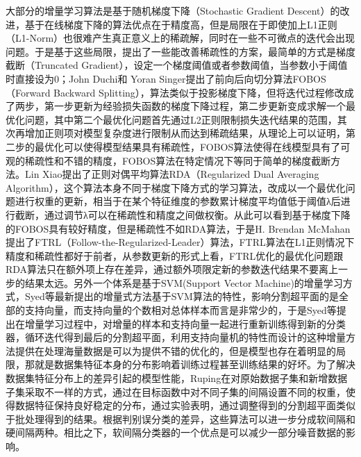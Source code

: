 大部分的增量学习算法是基于随机梯度下降（Stochastic Gradient Descent）的改进\cite{hazan2007logarithmic}，基于在线梯度下降的算法优点在于精度高，但是局限在于即使加上L1正则（L1-Norm）也很难产生真正意义上的稀疏解，同时在一些不可微点的迭代会出现问题。于是基于这些局限，提出了一些能改善稀疏性的方案，最简单的方式是梯度截断（Truncated Gradient）\cite{langford2009sparse}，设定一个梯度阈值或者参数阈值，当参数小于阈值时直接设为0；John Duchi和 Yoran Singer\cite{duchi2009efficient}提出了前向后向切分算法FOBOS（Forward Backward Splitting），算法类似于投影梯度下降，但将迭代过程修改成了两步，第一步更新为经验损失函数的梯度下降过程，第二步更新变成求解一个最优化问题，其中第二个最优化问题首先通过L2正则限制损失迭代结果的范围，其次再增加正则项对模型复杂度进行限制从而达到稀疏结果，从理论上可以证明，第二步的最优化可以使得模型结果具有稀疏性，FOBOS算法使得在线模型具有了可观的稀疏性和不错的精度，FOBOS算法在特定情况下等同于简单的梯度截断方法。Lin Xiao\cite{xiao2010dual}提出了正则对偶平均算法RDA（Regularized Dual Averaging Algorithm），这个算法本身不同于梯度下降方式的学习算法，改成以一个最优化问题进行权重的更新，相当于在某个特征维度的参数累计梯度平均值低于阈值λ后进行截断，通过调节λ可以在稀疏性和精度之间做权衡。从此可以看到基于梯度下降的FOBOS具有较好精度，但是稀疏性不如RDA算法，于是H. Brendan McMahan提出了FTRL（Follow-the-Regularized-Leader）算法\cite{mcmahan2011follow}，FTRL算法在L1正则情况下精度和稀疏性都好于前者，从参数更新的形式上看，FTRL优化的最优化问题跟RDA算法只在额外项上存在差异，通过额外项限定新的参数迭代结果不要离上一步的结果太远。另外一个体系是基于SVM(Support Vector Machine)的增量学习方式，Syed等\cite{syed1999incremental}最新提出的增量式方法基于SVM算法的特性，影响分割超平面的是全部的支持向量，而支持向量的个数相对总体样本而言是非常少的，于是Syed等提出在增量学习过程中，对增量的样本和支持向量一起进行重新训练得到新的分类器，循环迭代得到最后的分割超平面，利用支持向量机的特性而设计的这种增量方法提供在处理海量数据是可以为提供不错的优化的，但是模型也存在着明显的局限，那就是数据集特征本身的分布影响着训练过程甚至训练结果的好坏。为了解决数据集特征分布上的差异引起的模型性能，Ruping\cite{ruping2001incremental}在对原始数据子集和新增数据子集采取不一样的方式，通过在目标函数中对不同子集的间隔设置不同的权重，使得数据特征保持良好稳定的分布，通过实验表明，通过调整得到的分割超平面类似于批处理得到的结果。根据判别误分类的差异，这些算法可以进一步分成软间隔和硬间隔两种。相比之下，软间隔分类器的一个优点是可以减少一部分噪音数据的影响\cite{kivinen2002large}。

